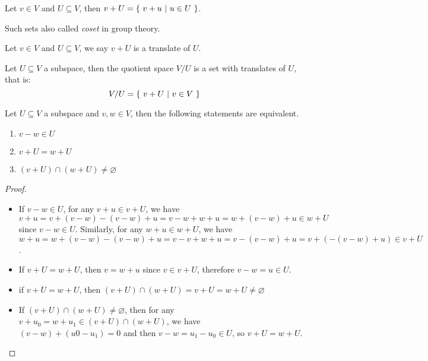 \documentclass[../main.tex]{subfiles}
\begin{document}
\setcounter{section}{3}
\setcounter{theorem}{94}

\begin{definition}[Notation: $v + U$]
  Let $v \in V$ and $U \subseteq V$, then $v + U = \{ \ v + u \ | \ u \in U \ \}$.
\end{definition}

Such sets also called \textit{coset} in group theory.

\setcounter{definition}{96}
\begin{definition}[Translate]
  Let $v \in V$ and $U \subseteq V$, we say $v + U$ is a translate of $U$.
\end{definition}

\begin{definition}
  Let $U \subseteq V$ a subspace, then the quotient space $V/U$ is a
  set with translates of $U$, that is:
  \[
  V/U = \{ \ v + U \ | \ v \in V \ \}
  \]
\end{definition}

\setcounter{theorem}{100}
\begin{theorem}
  Let $U \subseteq V$ a subspace and $v, w \in V$, then the following statements
  are equivalent.
  \begin{enumerate}
    \item $v - w \in U$
    \item $v + U = w + U$
    \item $(v + U) \cap (w + U) \neq \varnothing$
  \end{enumerate}
\end{theorem}
\begin{proof}
  ~
  \begin{itemize}
    \item If $v - w \in U$, for any $v + u \in v + U$, we have
          $v + u = v + (v - w) - (v - w) + u = v - w + w + u = w + (v - w) + u \in w + U$
          since $v - w \in U$. Similarly, for any $w + u \in w + U$, we have
          $w + u = w + (v - w) - (v - w) + u = v - v + w + u = v - (v - w) + u = v + (- (v - w) + u) \in v + U$.
    \item If $v + U = w + U$, then $v = w + u$ since $v \in v + U$, therefore $v - w = u \in U$.
    \item if $v + U = w + U$, then $(v + U) \cap (w + U) = v + U = w + U \neq \varnothing$
    \item If $(v + U) \cap (w + U) \neq \varnothing$, then for any $v + u_0 = w + u_1 \in (v + U) \cap (w + U)$,
          we have $(v - w) + (u0 - u_1) = 0$ and then $v - w = u_1 - u_0 \in U$,
          so $v + U = w + U$.
  \end{itemize}
\end{proof}
\end{document}
